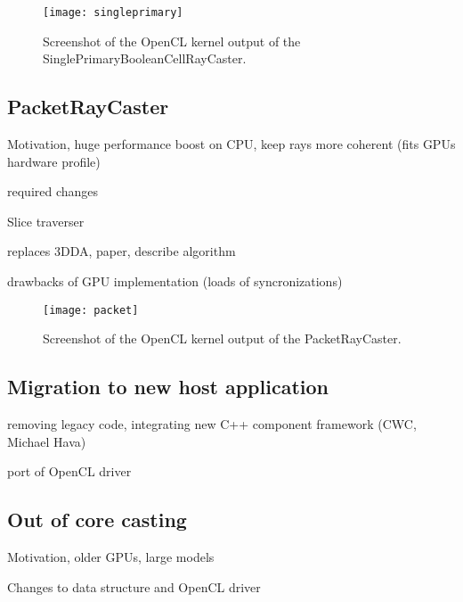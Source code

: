 \begin{figure}[h]
\centering
\texttt{[image: singleprimary]}
\caption{Screenshot of the OpenCL kernel output of the SinglePrimaryBooleanCellRayCaster.}
\label{fig:singleprimary}
\end{figure}

\subsection{PacketRayCaster}

Motivation, huge performance boost on CPU, keep rays more coherent (fits GPUs hardware profile)

required changes

Slice traverser

replaces 3DDA, paper, describe algorithm

drawbacks of GPU implementation (loads of syncronizations)

\begin{figure}[h]
\centering
\texttt{[image: packet]}
\caption{Screenshot of the OpenCL kernel output of the PacketRayCaster.}
\label{fig:packet}
\end{figure}

\subsection{Migration to new host application}
\label{sec:migration}

removing legacy code, integrating new C++ component framework (CWC, Michael Hava)

port of OpenCL driver

\subsection{Out of core casting}
\label{sec:out_of_core}

Motivation, older GPUs, large models

Changes to data structure and OpenCL driver

